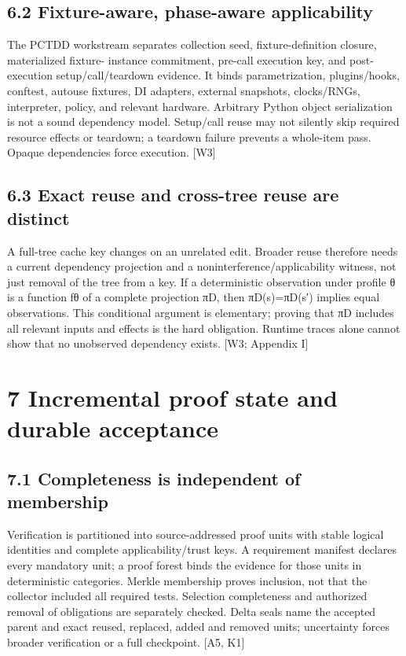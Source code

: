 \documentclass{article}
\begin{document}
\subsection*{6.2 Fixture-aware, phase-aware applicability}

The PCTDD workstream separates collection seed, fixture-definition closure, materialized fixture-
instance commitment, pre-call execution key, and post-execution setup/call/teardown evidence. It
binds parametrization, plugins/hooks, conftest, autouse fixtures, DI adapters, external snapshots,
clocks/RNGs, interpreter, policy, and relevant hardware. Arbitrary Python object serialization is
not a sound dependency model. Setup/call reuse may not silently skip required resource effects or
teardown; a teardown failure prevents a whole-item pass. Opaque dependencies force execution.
[W3]

\subsection*{6.3 Exact reuse and cross-tree reuse are distinct}

A full-tree cache key changes on an unrelated edit. Broader reuse therefore needs a current dependency
projection and a noninterference/applicability witness, not just removal of the tree from a key. If
a deterministic observation under profile θ is a function fθ of a complete projection πD, then
πD(s)=πD(s′) implies equal observations. This conditional argument is elementary; proving that πD
includes all relevant inputs and effects is the hard obligation. Runtime traces alone cannot show that
no unobserved dependency exists. [W3; Appendix I]

\section*{7 Incremental proof state and durable acceptance}
\subsection*{7.1 Completeness is independent of membership}

Verification is partitioned into source-addressed proof units with stable logical identities and complete
applicability/trust keys. A requirement manifest declares every mandatory unit; a proof forest binds
the evidence for those units in deterministic categories. Merkle membership proves inclusion, not
that the collector included all required tests. Selection completeness and authorized removal of
obligations are separately checked. Delta seals name the accepted parent and exact reused, replaced,
added and removed units; uncertainty forces broader verification or a full checkpoint. [A5, K1]
\end{document}
